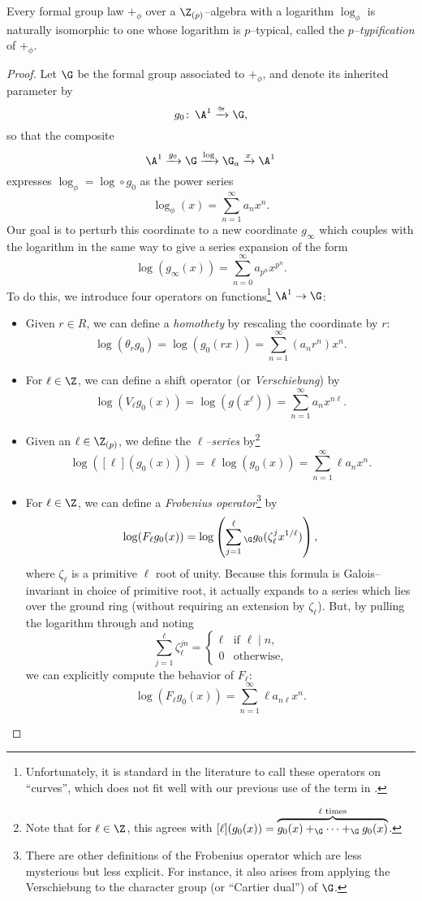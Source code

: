 \begin{lemma}\label{EveryLogHaspTypification}
Every formal group law $+_\phi$ over a $\Z_{(p)}$--algebra with a logarithm $\log_\phi$ is naturally isomorphic to one whose logarithm is $p$--typical, called the \textit{$p$--typification} of $+_\phi$.
\end{lemma}
\begin{proof}
Let $\G$ be the formal group associated to $+_\phi$, and denote its inherited parameter by \[g_0\co \A^1 \xrightarrow{\cong} \G,\] so that the composite \[\A^1 \xrightarrow{g_0} \G \xrightarrow{\log} \G_a \xrightarrow{x} \A^1\] expresses $\log_\phi = \log \circ g_0$ as the power series \[\log_\phi(x) = \sum_{n=1}^\infty a_n x^n.\]  Our goal is to perturb this coordinate to a new coordinate $g_\infty$ which couples with the logarithm in the same way to give a series expansion of the form \[\log(g_\infty(x)) = \sum_{n=0}^\infty a_{p^n} x^{p^n}.\]  To do this, we introduce four operators on functions\footnote{Unfortunately, it is standard in the literature to call these operators on ``curves'', which does not fit well with our previous use of the term in .} $\A^1 \to \G$:
\begin{itemize}
\item Given $r \in R$, we can define a \textit{homothety} by rescaling the coordinate by $r$: \[\log(\theta_r g_0) = \log(g_0(rx)) = \sum_{n=1}^\infty (a_n r^n) x^n.\]
\item For $\ell \in \Z$, we can define a shift operator (or \textit{Verschiebung}) by \[\log(V_\ell g_0(x)) = \log(g(x^\ell)) = \sum_{n=1}^\infty a_n x^{n \ell}.\]
\item Given an $\ell \in \Z_{(p)}$, we define the \textit{$\ell$--series} by\footnote{Note that for $\ell \in \Z$, this agrees with $[\ell](g_0(x)) = \overset{\text{$\ell$ times}}{\overbrace{g_0(x) +_{\G} \cdots +_{\G} g_0(x)}}$.} \[\log([\ell](g_0(x))) = \ell \log(g_0(x)) = \sum_{n=1}^\infty \ell a_n x^n.\]
\item For $\ell \in \Z$, we can define a \textit{Frobenius operator}\footnote{There are other definitions of the Frobenius operator which are less mysterious but less explicit.  For instance, it also arises from applying the Verschiebung to the character group (or ``Cartier dual'') of $\G$.} by \[\log(F_\ell g_0(x)) = \log\left(\sum_{j=1}^\ell{}_{\G} g_0(\zeta_\ell^j x^{1/\ell}) \right),\] where $\zeta_\ell$ is a primitive $\ell${\th} root of unity.  Because this formula is Galois--invariant in choice of primitive root, it actually expands to a series which lies over the ground ring (without requiring an extension by $\zeta_\ell$).  But, by pulling the logarithm through and noting \[\sum_{j=1}^\ell \zeta_\ell^{jn} = \begin{cases}\ell & \text{if $\ell \mid n$}, \\ 0 & \text{otherwise}, \end{cases}\] we can explicitly compute the behavior of $F_\ell$: \[\log(F_\ell g_0(x)) = \sum_{n=1}^\infty \ell a_{n \ell} x^n.\]

\end{itemize}
\end{proof}
